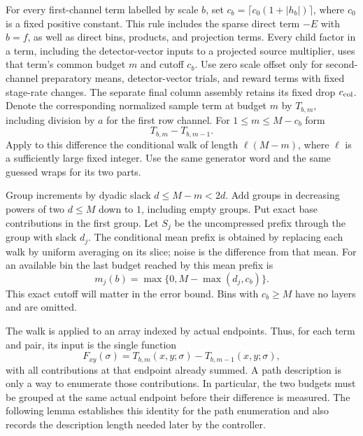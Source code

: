 For every first-channel term labelled by scale $b$, set
$c_b=\lceil c_0(1+|h_b|)\rceil$, where $c_0$ is a fixed positive constant.
This rule includes the sparse direct term $-E$ with $b=f$, as well as
direct bins, products, and projection terms.  Every child factor in a
term, including the detector-vector inputs to a projected source
multiplier, uses that term's common budget $m$ and cutoff $c_b$.
Use zero scale offset only for second-channel preparatory means,
detector-vector trials, and reward terms with fixed stage-rate changes.
The separate final column assembly retains its fixed drop
$c_{\rm col}$.  Denote the corresponding normalized
sample term at budget $m$ by $T_{b,m}$, including division by $a$ for the
first row channel.  For $1\le m\le M-c_b$ form
\begin{equation}
 T_{b,m}-T_{b,m-1}.
 \label{eq:est-difference}
\end{equation}
Apply to this difference the conditional walk of length
$\ell(M-m)$, where $\ell$ is a sufficiently large fixed integer.  Use the
same generator word and the same guessed wraps for its two parts.

Group increments by dyadic slack
$d\le M-m<2d$.  Add groups in decreasing powers of two $d\le M$ down to
$1$, including empty groups.  Put exact base contributions in the first
group.  Let $S_j$ be the uncompressed prefix through the group with slack
$d_j$.  The conditional mean prefix is obtained by replacing each walk by
uniform averaging on its slice; noise is the difference from that mean.
For an available bin the last budget reached by this mean prefix is
\begin{equation}
 m_j(b)=\max\{0,M-\max(d_j,c_b)\}.
 \label{eq:est-last-budget}
\end{equation}
This exact cutoff will matter in the error bound.  Bins with $c_b\ge M$
have no layers and are omitted.


The walk is applied to an array indexed by actual endpoints.  Thus,
for each term and pair, its input is the single function
\[
 F_{xy}(\sigma)=T_{b,m}(x,y;\sigma)-T_{b,m-1}(x,y;\sigma),
\]
with all contributions at that endpoint already summed.  A path
description is only a way to enumerate those contributions.  In
particular, the two budgets must be grouped at the same actual
endpoint before their difference is measured.  The following lemma
establishes this identity for the path enumeration and also records
the description length needed later by the controller.

